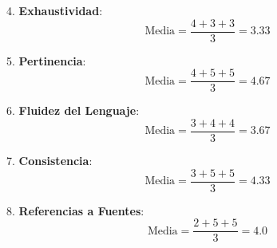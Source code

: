 4. \textbf{Exhaustividad}:
\begin{equation}
\text{Media} = \frac{4 + 3 + 3}{3} = 3.33
\end{equation}

5. \textbf{Pertinencia}:
\begin{equation}
\text{Media} = \frac{4 + 5 + 5}{3} = 4.67
\end{equation}

6. \textbf{Fluidez del Lenguaje}:
\begin{equation}
\text{Media} = \frac{3 + 4 + 4}{3} = 3.67
\end{equation}

7. \textbf{Consistencia}:
\begin{equation}
\text{Media} = \frac{3 + 5 + 5}{3} = 4.33
\end{equation}

8. \textbf{Referencias a Fuentes}:
\begin{equation}
\text{Media} = \frac{2 + 5 + 5}{3} = 4.0
\end{equation}
